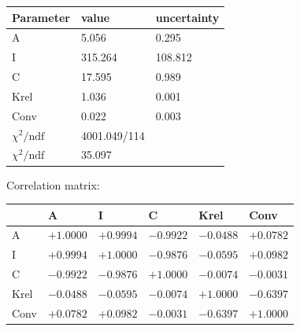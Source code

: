 \begin{tabular}{l|ll}
Parameter & value & uncertainty \\ \hline
 A & 5.056 & 0.295 \\ 
 I & 315.264 & 108.812 \\ 
 C & 17.595 & 0.989 \\ 
 Krel & 1.036 & 0.001 \\ 
 Conv & 0.022 & 0.003 \\ 
 \hline
 $\chi^2/\mathrm{ndf}$ & 4001.049/114 & \\
 $\chi^2/\mathrm{ndf}$ & 35.097 & \\
\end{tabular}

Correlation matrix:

\begin{tabular}{l|lllll} 
 & A & I & C & Krel & Conv \\ \hline
 A & $+1.0000$ & $+0.9994$ & $-0.9922$ & $-0.0488$ & $+0.0782$ \\ 
 I & $+0.9994$ & $+1.0000$ & $-0.9876$ & $-0.0595$ & $+0.0982$ \\ 
 C & $-0.9922$ & $-0.9876$ & $+1.0000$ & $-0.0074$ & $-0.0031$ \\ 
 Krel & $-0.0488$ & $-0.0595$ & $-0.0074$ & $+1.0000$ & $-0.6397$ \\ 
 Conv & $+0.0782$ & $+0.0982$ & $-0.0031$ & $-0.6397$ & $+1.0000$ \\ 
\end{tabular}
